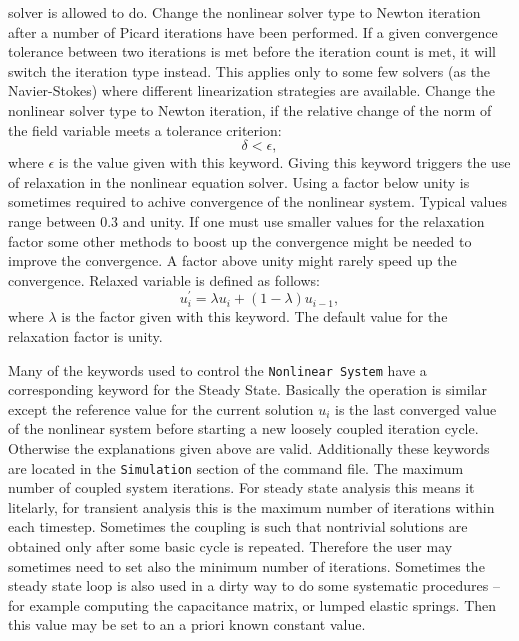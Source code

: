 solver is allowed to do.
%
Change the nonlinear solver type to
Newton iteration after a number of Picard iterations have been performed. If a given
convergence tolerance between two iterations is met before the iteration count is met,
it will switch the iteration type instead. This applies only to some few solvers (as the Navier-Stokes)
where different linearization strategies are available.
%
Change the nonlinear solver type to
Newton iteration, if the relative change of the norm of the field variable meets a
tolerance criterion:
$$
 \delta < \epsilon,
$$
where $\epsilon$ is the value given with this keyword.
%
Giving this keyword triggers the use
of relaxation in the nonlinear equation solver.
Using a factor below unity is sometimes required to achive convergence of the nonlinear system.
Typical values range between 0.3 and unity. If one must use smaller values for the relaxation
factor some other methods to boost up the convergence might be needed to improve the convergence.
A factor above unity might rarely speed up the convergence. Relaxed variable is defined as follows:
$$
 u^{'}_i = \lambda u_i + (1-\lambda) u_{i-1},
$$
where $\lambda$ is the factor given with this keyword. The default value for the relaxation factor
is unity. 
%
\sifend


Many of the keywords used to control the \texttt{Nonlinear System} have a corresponding 
keyword for the {Steady State}. Basically the operation is similar except the 
reference value for the current solution $u_i$ is the last converged value of the nonlinear system
before starting a new loosely coupled iteration cycle. Otherwise the explanations given above are valid.
\sifbegin
{} 
\sifend 
Additionally these keywords are located in the \texttt{Simulation} section
of the command file.
\sifbegin
{}
The maximum number of coupled system iterations. For steady state analysis this means
it litelarly, for transient analysis this is the maximum number of iterations within each timestep.
%
Sometimes the coupling is such that nontrivial solutions are obtained only after some basic
cycle is repeated. Therefore the user may sometimes need to set also the minimum number of
iterations. Sometimes the steady state loop is also used in a dirty way to do some 
systematic procedures -- for example computing the capacitance matrix, or lumped elastic springs.
Then this value may be set to an a priori known constant value.
\sifend







